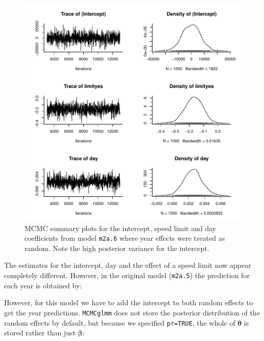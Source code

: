 \documentclass{article}
\begin{document}
\begin{figure}[!h]
\begin{center}
\includegraphics{Lecture2-046}
\end{center}
\caption{MCMC summary plots for the intercept, speed limit and day coefficients from model \texttt{m2a.6} where year effects were treated as random. Note the high posterior variance for the intercept.}
\label{yrandom-fig}
\end{figure}

The estimates for the intercept, day and the effect of a speed limit now appear completely different.  However, in the original model (\texttt{m2a.5}) the prediction for each year is obtained by:

\begin{Schunk}
\end{Schunk}

However, for this model we have to add the intercept to both random effects to get the year predictions. \texttt{MCMCglmm} does not store the posterior distribution of the random effects by default, but because we specified \texttt{pr=TRUE}, the whole of ${\bm \theta}$ is stored rather than just ${\bm \beta}$:  
\end{document}
